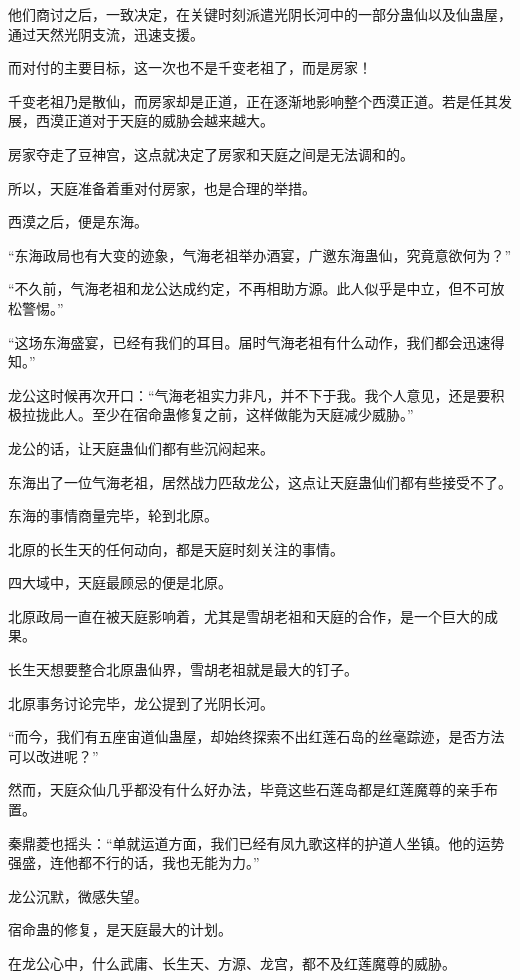 \begin{this_body}
他们商讨之后，一致决定，在关键时刻派遣光阴长河中的一部分蛊仙以及仙蛊屋，通过天然光阴支流，迅速支援。

而对付的主要目标，这一次也不是千变老祖了，而是房家！

千变老祖乃是散仙，而房家却是正道，正在逐渐地影响整个西漠正道。若是任其发展，西漠正道对于天庭的威胁会越来越大。

房家夺走了豆神宫，这点就决定了房家和天庭之间是无法调和的。

所以，天庭准备着重对付房家，也是合理的举措。

西漠之后，便是东海。

“东海政局也有大变的迹象，气海老祖举办酒宴，广邀东海蛊仙，究竟意欲何为？”

“不久前，气海老祖和龙公达成约定，不再相助方源。此人似乎是中立，但不可放松警惕。”

“这场东海盛宴，已经有我们的耳目。届时气海老祖有什么动作，我们都会迅速得知。”

龙公这时候再次开口：“气海老祖实力非凡，并不下于我。我个人意见，还是要积极拉拢此人。至少在宿命蛊修复之前，这样做能为天庭减少威胁。”

龙公的话，让天庭蛊仙们都有些沉闷起来。

东海出了一位气海老祖，居然战力匹敌龙公，这点让天庭蛊仙们都有些接受不了。

东海的事情商量完毕，轮到北原。

北原的长生天的任何动向，都是天庭时刻关注的事情。

四大域中，天庭最顾忌的便是北原。

北原政局一直在被天庭影响着，尤其是雪胡老祖和天庭的合作，是一个巨大的成果。

长生天想要整合北原蛊仙界，雪胡老祖就是最大的钉子。

北原事务讨论完毕，龙公提到了光阴长河。

“而今，我们有五座宙道仙蛊屋，却始终探索不出红莲石岛的丝毫踪迹，是否方法可以改进呢？”

然而，天庭众仙几乎都没有什么好办法，毕竟这些石莲岛都是红莲魔尊的亲手布置。

秦鼎菱也摇头：“单就运道方面，我们已经有凤九歌这样的护道人坐镇。他的运势强盛，连他都不行的话，我也无能为力。”

龙公沉默，微感失望。

宿命蛊的修复，是天庭最大的计划。

在龙公心中，什么武庸、长生天、方源、龙宫，都不及红莲魔尊的威胁。


\end{this_body}
